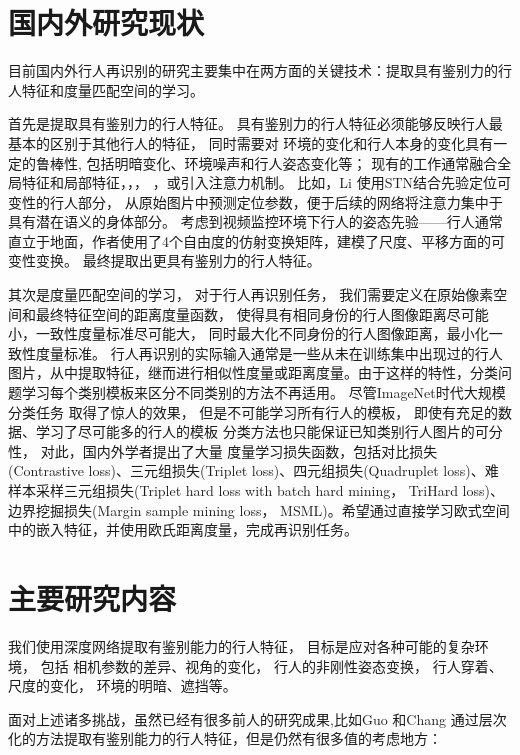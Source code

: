 \section{国内外研究现状}

目前国内外行人再识别的研究主要集中在两方面的关键技术：提取具有鉴别力的行人特征和度量匹配空间的学习。

首先是提取具有鉴别力的行人特征。
具有鉴别力的行人特征必须能够反映行人最基本的区别于其他行人的特征，
同时需要对
环境的变化和行人本身的变化具有一定的鲁棒性,
包括明暗变化、环境噪声和行人姿态变化等；
现有的工作通常融合全局特征和局部特征\cite{reciprocal}，\cite{liu2017hydraplus}，\cite{zhao2017spindle}，
\cite{glad}，或引入注意力机制。
比如，Li \etal \cite{latent}使用STN结合先验定位可变性的行人部分，
从原始图片中预测定位参数，便于后续的网络将注意力集中于具有潜在语义的身体部分。
考虑到视频监控环境下行人的姿态先验——行人通常直立于地面，作者使用了4个自由度的仿射变换矩阵，建模了尺度、平移方面的可变性变换。
最终提取出更具有鉴别力的行人特征。

其次是度量匹配空间的学习，
对于行人再识别任务，
我们需要定义在原始像素空间和最终特征空间的距离度量函数，
使得具有相同身份的行人图像距离尽可能小，一致性度量标准尽可能大，
同时最大化不同身份的行人图像距离，最小化一致性度量标准。
行人再识别的实际输入通常是一些从未在训练集中出现过的行人图片，从中提取特征，继而进行相似性度量或距离度量。由于这样的特性，分类问题学习每个类别模板来区分不同类别的方法不再适用。 
尽管ImageNet时代大规模分类任务\cite{deng2009imagenet}
取得了惊人的效果，
但是不可能学习所有行人的模板，
即使有充足的数据、学习了尽可能多的行人的模板
分类方法也只能保证已知类别行人图片的可分性，
对此，国内外学者提出了大量
度量学习损失函数，包括对比损失(Contrastive loss)\cite{varior2016gated}、三元组损失(Triplet loss)\cite{schroff2015facenet}、四元组损失(Quadruplet loss)\cite{chen2017beyond}、难样本采样三元组损失(Triplet hard loss with batch hard mining， TriHard loss)\cite{hermans2017defense}、边界挖掘损失(Margin sample mining loss， MSML)\cite{xiao2017margin}。希望通过直接学习欧式空间中的嵌入特征，并使用欧氏距离度量，完成再识别任务。

\section{主要研究内容}

我们使用深度网络提取有鉴别能力的行人特征，
目标是应对各种可能的复杂环境，
包括
相机参数的差异、视角的变化，
行人的非刚性姿态变换，
行人穿着、尺度的变化，
环境的明暗、遮挡等。

面对上述诸多挑战，虽然已经有很多前人的研究成果,比如Guo \etal\cite{guo2018multilevel}和Chang \etal\cite{chang2018factor}通过层次化的方法提取有鉴别能力的行人特征，但是仍然有很多值的考虑地方：

